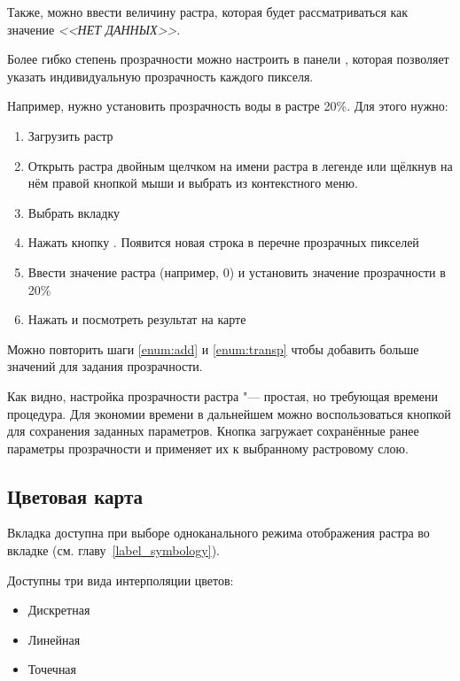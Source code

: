 Также, можно ввести величину растра, которая будет рассматриваться
как значение {\em <<НЕТ ДАННЫХ>>}.

Более гибко степень прозрачности можно настроить в панели
, которая позволяет указать индивидуальную
прозрачность каждого пикселя.

Например, нужно установить прозрачность воды в растре
 20\%. Для этого нужно:
\begin{enumerate}
 \item  Загрузить растр 
 \item Открыть  растра двойным щелчком на имени растра в легенде
 или щёлкнув на нём правой кнопкой мыши и выбрать 
 из контекстного меню.
 \item Выбрать вкладку 
 \item \label{enum:add} Нажать кнопку
 . Появится
 новая строка в перечне прозрачных пикселей
 \item \label{enum:transp} Ввести значение растра (например, 0) и
 установить значение прозрачности в 20\%
 \item Нажать  и посмотреть результат на карте
\end{enumerate}

Можно повторить шаги \ref{enum:add} и \ref{enum:transp} чтобы добавить
больше значений для задания прозрачности.

Как видно, настройка прозрачности растра "--- простая, но требующая времени
процедура. Для экономии времени в дальнейшем можно воспользоваться кнопкой
 для сохранения заданных
параметров. Кнопка 
загружает сохранённые ранее параметры прозрачности и применяет их к
выбранному растровому слою.

\subsection{Цветовая карта} \label{label_colormaptab}

Вкладка  доступна при выборе одноканального режима
отображения растра во вкладке  (см. главу~\ref{label_symbology}).

Доступны три вида интерполяции цветов:
\begin{itemize}[label=--]
\item Дискретная
\item Линейная
\item Точечная
\end{itemize}

